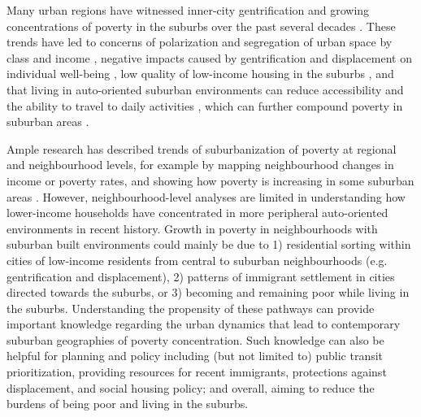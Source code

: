 Many urban regions have witnessed inner-city gentrification and growing concentrations of poverty in the suburbs over the past several decades \cite{ehrenhalt_great_2012,ades_are_2012,grant_changing_2020}. These trends have led to concerns of polarization and segregation of urban space by class and income \cite{hulchanski_three_2010}, negative impacts caused by gentrification and displacement on individual well-being \cite{elliott-cooper_moving_2020}, low quality of low-income housing in the suburbs \cite{august_gentrification_2018}, and that living in auto-oriented suburban environments can reduce accessibility and the ability to travel to daily activities \cite{allen_planning_2020}, which can further compound poverty in suburban areas \cite{lucas_transport_2012}.

Ample research has described trends of suburbanization of poverty at regional and neighbourhood levels, for example by mapping neighbourhood changes in income or poverty rates, and showing how poverty is increasing in some suburban areas \cite{hulchanski_three_2010,ades_are_2012,breau_pulling_2018,grant_changing_2020}. However, neighbourhood-level analyses are limited in understanding how lower-income households have concentrated in more peripheral auto-oriented environments in recent history. Growth in poverty in neighbourhoods with suburban built environments could mainly be due to 1) residential sorting within cities of low-income residents from central to suburban neighbourhoods (e.g. gentrification and displacement), 2) patterns of immigrant settlement in cities directed towards the suburbs, or 3) becoming and remaining poor while living in the suburbs.  Understanding the propensity of these pathways can provide important knowledge regarding the urban dynamics that lead to contemporary suburban geographies of poverty concentration. Such knowledge can also be helpful for planning and policy including (but not limited to) public transit prioritization, providing resources for recent immigrants, protections against displacement, and social housing policy; and overall, aiming to reduce the burdens of being poor and living in the suburbs.

